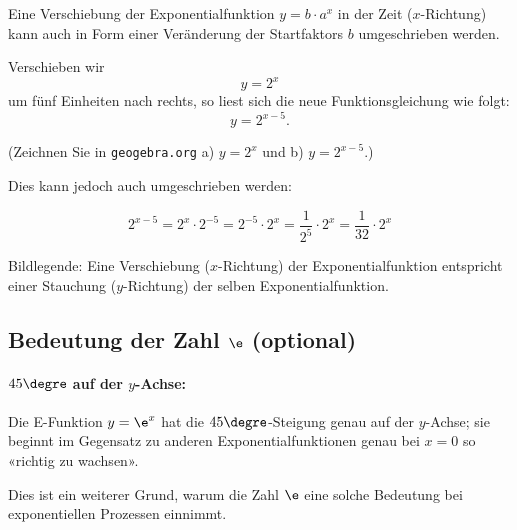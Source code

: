 Eine Verschiebung der Exponentialfunktion $y=b\cdot{}a^x$ in der Zeit ($x$-Richtung) kann auch in Form einer Veränderung der Startfaktors $b$ umgeschrieben werden.

Verschieben wir \zB $$y=2^x$$ um fünf Einheiten nach rechts, so liest sich die neue Funktionsgleichung wie folgt:
$$y=2^{x-5}.$$

(Zeichnen Sie in \texttt{geogebra.org} a) $y=2^x$ und b) $y=2^{x-5}$.)

Dies kann jedoch auch umgeschrieben werden:

$$2^{x-5} = 2^x \cdot{} 2^{-5} = 2^{-5} \cdot{} 2^x = \frac{1}{2^5} \cdot{} 2^x =
\frac{1}{32}\cdot{}2^x$$

Bildlegende: Eine Verschiebung ($x$-Richtung) der Exponentialfunktion entspricht einer Stauchung ($y$-Richtung) der selben Exponentialfunktion.


\newpage

\subsection{Bedeutung der Zahl $\e$ (optional)}

\paragraph{$45\degre$ auf der $y$-Achse:}
Die E-Funktion $y=\e^x$ hat die $45\degre$-Steigung genau auf der $y$-Achse; sie beginnt im Gegensatz zu anderen Exponentialfunktionen genau bei $x=0$ so «richtig zu wachsen».


Dies ist ein weiterer Grund, warum die Zahl $\e$ eine solche Bedeutung bei
exponentiellen Prozessen einnimmt.



